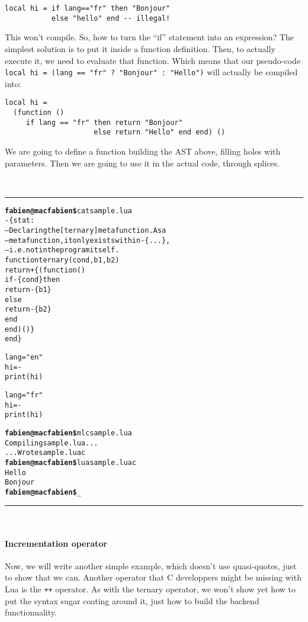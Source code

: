 \begin{verbatim}
local hi = if lang=="fr" then "Bonjour" 
           else "hello" end -- illegal!
\end{verbatim}

This won't compile. So, how to turn the ``if'' statement into an
expression? The simplest solution is to put it inside a function
definition. Then, to actually execute it, we need to evaluate that
function. Which means that our pseudo-code
\verb|local hi = (lang == "fr" ? "Bonjour" : "Hello")| will 
actually be compiled into:

\begin{verbatim}
local hi = 
  (function ()
     if lang == "fr" then return "Bonjour"
                     else return "Hello" end end) ()
\end{verbatim}

We are going to define a function building the AST above, filling
holes with parameters. Then we are going to use it in the actual code,
through splices.

~\\\hrule
\begin{alltt}
{\bf{}fabien@macfabien\$} cat sample.lua
-\{stat:
  -- Declaring the [ternary] metafunction. As a 
  -- metafunction, it only exists within -\{...\}, 
  -- i.e. not in the program itself.
  function ternary (cond, b1, b2)
     return +\{ (function() 
                    if -\{cond\} then
                       return -\{b1\} 
                    else
                       return -\{b2\}
                    end
                 end)() \}
  end \}

lang = "en"
hi = -
print (hi)

lang = "fr"
hi = -
print (hi)

{\bf{}fabien@macfabien\$} mlc sample.lua
Compiling sample.lua...
...Wrote sample.luac
{\bf{}fabien@macfabien\$} lua sample.luac
Hello
Bonjour
{\bf{}fabien@macfabien\$} _
\end{alltt}
\hrule~\\

\paragraph{Incrementation operator}
Now, we will write another simple example, which doesn't use
quasi-quotes, just to show that we can. Another operator that C
developpers might be missing with Lua is the \verb|++| operator. As
with the ternary operator, we won't show yet how to put the syntax
sugar coating around it, just how to build the backend functionnality.

